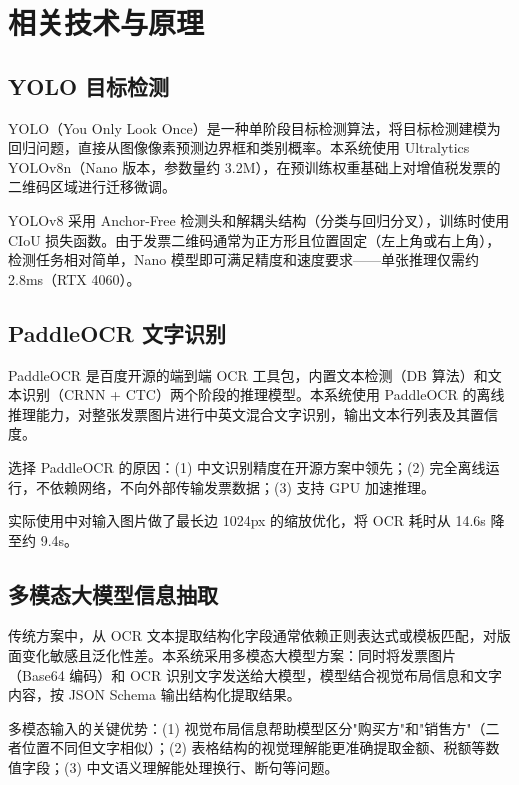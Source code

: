 \documentclass[12pt,a4paper]{ctexart}
\begin{document}
\section{相关技术与原理}

\subsection{YOLO 目标检测}

YOLO（You Only Look Once）是一种单阶段目标检测算法，将目标检测建模为回归问题，直接从图像像素预测边界框和类别概率。本系统使用 Ultralytics YOLOv8n（Nano 版本，参数量约 3.2M），在预训练权重基础上对增值税发票的二维码区域进行迁移微调。

YOLOv8 采用 Anchor-Free 检测头和解耦头结构（分类与回归分叉），训练时使用 CIoU 损失函数。由于发票二维码通常为正方形且位置固定（左上角或右上角），检测任务相对简单，Nano 模型即可满足精度和速度要求——单张推理仅需约 2.8ms（RTX 4060）。

\subsection{PaddleOCR 文字识别}

PaddleOCR 是百度开源的端到端 OCR 工具包，内置文本检测（DB 算法）和文本识别（CRNN + CTC）两个阶段的推理模型。本系统使用 PaddleOCR 的离线推理能力，对整张发票图片进行中英文混合文字识别，输出文本行列表及其置信度。

选择 PaddleOCR 的原因：(1) 中文识别精度在开源方案中领先；(2) 完全离线运行，不依赖网络，不向外部传输发票数据；(3) 支持 GPU 加速推理。

实际使用中对输入图片做了最长边 1024px 的缩放优化，将 OCR 耗时从 14.6s 降至约 9.4s。

\subsection{多模态大模型信息抽取}

传统方案中，从 OCR 文本提取结构化字段通常依赖正则表达式或模板匹配，对版面变化敏感且泛化性差。本系统采用多模态大模型方案：同时将发票图片（Base64 编码）和 OCR 识别文字发送给大模型，模型结合视觉布局信息和文字内容，按 JSON Schema 输出结构化提取结果。

多模态输入的关键优势：(1) 视觉布局信息帮助模型区分"购买方"和"销售方"（二者位置不同但文字相似）；(2) 表格结构的视觉理解能更准确提取金额、税额等数值字段；(3) 中文语义理解能处理换行、断句等问题。
\end{document}
